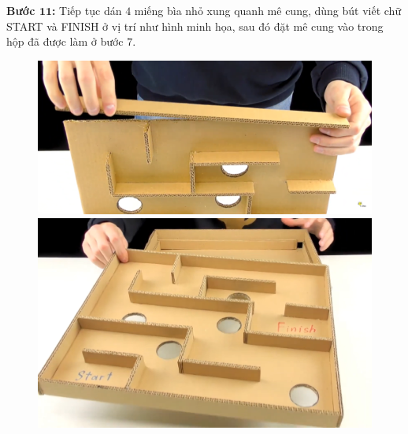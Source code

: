 \begin{multicols}{2}
\begin{figure}[H]
		\vspace*{-10pt}
	\end{figure}
	\textbf{\color{toancuabi}Bước $\pmb{11}$:} Tiếp tục dán $4$ miếng bìa nhỏ xung quanh mê cung, dùng bút viết chữ START và FINISH ở vị trí như hình minh họa, sau đó đặt mê cung vào trong hộp đã được làm ở bước $7$.
	\begin{figure}[H]
		\vspace*{-5pt}
		\centering
		\captionsetup{labelformat= empty, justification=centering}
		\includegraphics[width= 0.8\linewidth]{18}
		
		\vspace*{1pt}
		\includegraphics[width= 0.8\linewidth]{19}
		

\end{figure}
\end{multicols}
